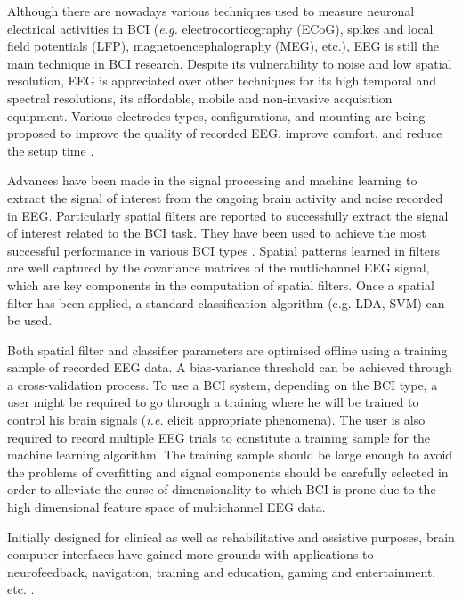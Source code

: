 Although there are nowadays various techniques used to measure neuronal electrical activities in BCI (\emph{e.g.} electrocorticography (ECoG), spikes and local field potentials (LFP), magnetoencephalography (MEG), etc.), EEG is still the main technique in BCI research. 
Despite its vulnerability to noise and low spatial resolution, EEG is appreciated over other techniques for its high temporal and spectral resolutions, its affordable, mobile and non-invasive acquisition equipment. 
Various electrodes types, configurations, and mounting are being proposed to improve the quality of recorded EEG, improve comfort, and reduce the setup time \citep{looney_--ear_2012, badcock_validation_2013}.  

Advances have been made in the signal processing and machine learning to extract the signal of interest from the ongoing brain activity and noise recorded in EEG.
Particularly spatial filters are reported to successfully extract the signal of interest related to the BCI task. 
They have been used to achieve the most successful performance in various BCI types \citep{ang_filter_2012, rivet_xdawn_2009, spuler_one_2012, kalunga_ssvep_2013, nakanishi_high-speed_2014}.
Spatial patterns learned in filters are well captured by the covariance matrices of the mutlichannel EEG signal, which are key components in the computation of spatial filters.
Once a spatial filter has been applied, a standard classification algorithm (e.g. LDA, SVM) can be used.   

Both spatial filter and classifier parameters are optimised offline using a training sample of recorded EEG data.
A bias-variance threshold can be achieved through a cross-validation process.
To use a BCI system, depending on the BCI type, a user might be required to go through a training where he will be trained to control his brain signals (\textit{i.e.} elicit appropriate phenomena). 
The user is also required to record multiple EEG trials to constitute a training sample for the machine learning algorithm. 
The training sample should be large enough to avoid the problems of overfitting and signal components should be carefully selected in order to alleviate the curse of dimensionality to which BCI is prone due to the high dimensional feature space of multichannel EEG data. 

Initially designed for clinical as well as rehabilitative and assistive purposes, brain computer interfaces have gained more grounds with applications to neurofeedback, navigation, training and education, gaming and entertainment, etc. \citep{millan_invasive_2010, van_erp_brain-computer_2012, lotte_electroencephalography_2015, abdulkader_brain_2015, mensia_mensia_2016,melomind_melomind_2016}.
 
